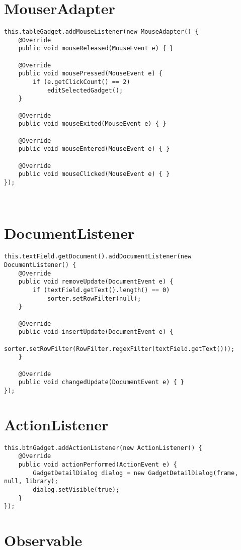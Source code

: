 \documentclass{report}
\begin{document}
\lstset{language=Java}
\section*{MouserAdapter}

\begin{lstlisting}
this.tableGadget.addMouseListener(new MouseAdapter() {
	@Override
	public void mouseReleased(MouseEvent e) { }
	
	@Override
	public void mousePressed(MouseEvent e) {
		if (e.getClickCount() == 2) 
			editSelectedGadget();
	}
	
	@Override
	public void mouseExited(MouseEvent e) { }
	
	@Override
	public void mouseEntered(MouseEvent e) { }
	
	@Override
	public void mouseClicked(MouseEvent e) { }
});

\end{lstlisting}
~\par
\section*{DocumentListener}

\begin{lstlisting}
this.textField.getDocument().addDocumentListener(new DocumentListener() {
	@Override
	public void removeUpdate(DocumentEvent e) {
		if (textField.getText().length() == 0) 
			sorter.setRowFilter(null);
	}
	
	@Override
	public void insertUpdate(DocumentEvent e) {
		sorter.setRowFilter(RowFilter.regexFilter(textField.getText()));
	}
	
	@Override
	public void changedUpdate(DocumentEvent e) { }
});

\end{lstlisting}
\newpage

\section*{ActionListener}

\begin{lstlisting}
this.btnGadget.addActionListener(new ActionListener() {
	@Override
	public void actionPerformed(ActionEvent e) {
		GadgetDetailDialog dialog = new GadgetDetailDialog(frame, null, library);
		dialog.setVisible(true);
	}
});
\end{lstlisting}

\section*{Observable}
\end{document}
